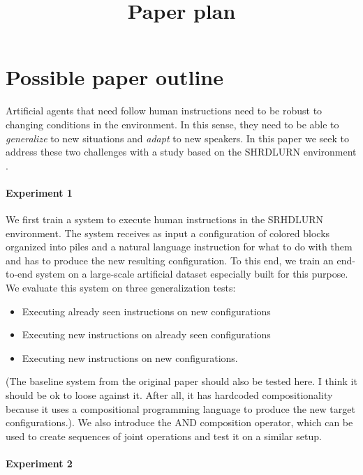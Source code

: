 \documentclass[11pt,a4paper]{article}
\title{Paper plan}
\date{}
\begin{document}
\maketitle
\begin{abstract}

\end{abstract}

\section{Possible paper outline}

Artificial agents that need follow human instructions need to be robust to 
changing conditions in the environment. In this sense, they need to be able to 
\emph{generalize} to new situations and \emph{adapt} to new speakers. In this 
paper we seek to address these two challenges with a study based on the 
SHRDLURN environment \cite{Wang:etal:2016}. 

\paragraph{Experiment 1} We first train a system to execute human instructions 
in the SRHDLURN environment. The system receives as input a configuration of 
colored  blocks organized into piles and a natural language instruction for 
what to do with them and has to produce the new resulting configuration. To 
this end, we train an end-to-end system on a large-scale artificial dataset 
especially built for this purpose. We evaluate this system on three 
generalization tests:

\begin{itemize}
	\item Executing already seen instructions on new configurations
	\item Executing new instructions on already seen configurations
	\item Executing new instructions on new configurations.
\end{itemize}

(The baseline system from the original paper should also be tested here. I 
think it should be ok to loose against it. After all, it has hardcoded 
compositionality because it uses a compositional programming language to 
produce the new target configurations.). We also introduce the AND composition 
operator, which can be used to create sequences of joint operations and test it 
on a similar setup.

\paragraph{Experiment 2}
\end{document}
